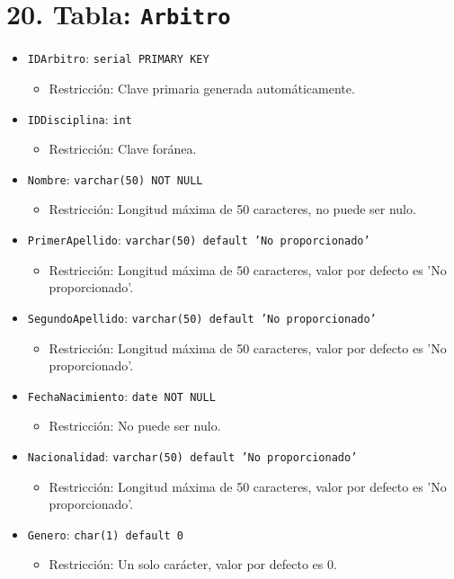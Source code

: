 \section*{20. Tabla: \texttt{Arbitro}}
\begin{itemize}
    \item \texttt{IDArbitro}: \texttt{serial PRIMARY KEY}
    \begin{itemize}
        \item Restricción: Clave primaria generada automáticamente.
    \end{itemize}
    \item \texttt{IDDisciplina}: \texttt{int}
    \begin{itemize}
        \item Restricción: Clave foránea.
    \end{itemize}
    \item \texttt{Nombre}: \texttt{varchar(50) NOT NULL}
    \begin{itemize}
        \item Restricción: Longitud máxima de 50 caracteres, no puede ser nulo.
    \end{itemize}
    \item \texttt{PrimerApellido}: \texttt{varchar(50) default 'No proporcionado'}
    \begin{itemize}
        \item Restricción: Longitud máxima de 50 caracteres, valor por defecto es 'No proporcionado'.
    \end{itemize}
    \item \texttt{SegundoApellido}: \texttt{varchar(50) default 'No proporcionado'}
    \begin{itemize}
        \item Restricción: Longitud máxima de 50 caracteres, valor por defecto es 'No proporcionado'.
    \end{itemize}
    \item \texttt{FechaNacimiento}: \texttt{date NOT NULL}
    \begin{itemize}
        \item Restricción: No puede ser nulo.
    \end{itemize}
    \item \texttt{Nacionalidad}: \texttt{varchar(50) default 'No proporcionado'}
    \begin{itemize}
        \item Restricción: Longitud máxima de 50 caracteres, valor por defecto es 'No proporcionado'.
    \end{itemize}
    \item \texttt{Genero}: \texttt{char(1) default 0}
    \begin{itemize}
        \item Restricción: Un solo carácter, valor por defecto es 0.
    \end{itemize}
\end{itemize}

